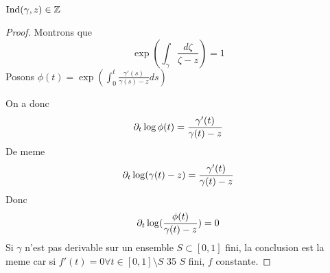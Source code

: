 \documentclass[../main.tex]{subfiles}
\begin{document}
\begin{thm}
	$\operatorname{Ind}( \gamma,z) \in \mathbb{Z}$ 
\end{thm}
\begin{proof}
Montrons que 
\[ 
	\exp( \int_{ \gamma }^{  }\frac{d\zeta}{\zeta-z}) =1
\]
Posons $\phi( t) = \exp ( \int_{ 0 }^{ t }\frac{\gamma'( s) }{\gamma( s) -z}ds) $ 

On a donc
\[ 
	\partial_t \log\phi( t) = \frac{\gamma'( t) }{\gamma( t) -z}
\]
De meme
\[ 
	\partial_t \log( \gamma( t) -z) = \frac{\gamma'( t) }{\gamma( t) -z}
\]
Donc
\[ 
	\partial_t \log ( \frac{\phi( t) }{\gamma( t) -z}) =0
\]
Si $\gamma$ n'est pas derivable sur un ensemble $S \subset [ 0,1] $ fini, la conclusion est la meme car si $f'( t) =0\forall t \in [ 0,1] \setminus S$ 35 $S$ fini, $f$ constante.
\end{proof}
\end{document}
